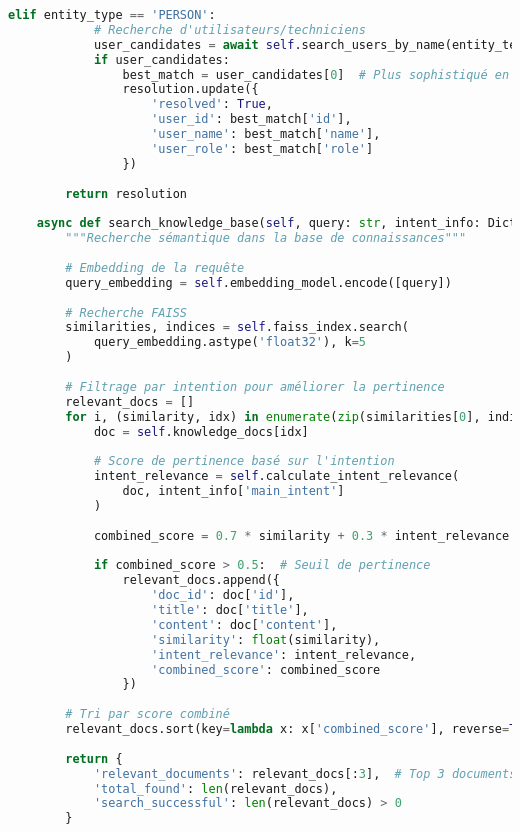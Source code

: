 \documentclass[12pt,a4paper]{report}
\begin{document}
\begin{lstlisting}[language=Python, caption=Pipeline NLP avancé pour le chatbot]
        elif entity_type == 'PERSON':
            # Recherche d'utilisateurs/techniciens
            user_candidates = await self.search_users_by_name(entity_text)
            if user_candidates:
                best_match = user_candidates[0]  # Plus sophistiqué en production
                resolution.update({
                    'resolved': True,
                    'user_id': best_match['id'],
                    'user_name': best_match['name'],
                    'user_role': best_match['role']
                })
        
        return resolution
    
    async def search_knowledge_base(self, query: str, intent_info: Dict) -> Dict:
        """Recherche sémantique dans la base de connaissances"""
        
        # Embedding de la requête
        query_embedding = self.embedding_model.encode([query])
        
        # Recherche FAISS
        similarities, indices = self.faiss_index.search(
            query_embedding.astype('float32'), k=5
        )
        
        # Filtrage par intention pour améliorer la pertinence
        relevant_docs = []
        for i, (similarity, idx) in enumerate(zip(similarities[0], indices[0])):
            doc = self.knowledge_docs[idx]
            
            # Score de pertinence basé sur l'intention
            intent_relevance = self.calculate_intent_relevance(
                doc, intent_info['main_intent']
            )
            
            combined_score = 0.7 * similarity + 0.3 * intent_relevance
            
            if combined_score > 0.5:  # Seuil de pertinence
                relevant_docs.append({
                    'doc_id': doc['id'],
                    'title': doc['title'],
                    'content': doc['content'],
                    'similarity': float(similarity),
                    'intent_relevance': intent_relevance,
                    'combined_score': combined_score
                })
        
        # Tri par score combiné
        relevant_docs.sort(key=lambda x: x['combined_score'], reverse=True)
        
        return {
            'relevant_documents': relevant_docs[:3],  # Top 3 documents
            'total_found': len(relevant_docs),
            'search_successful': len(relevant_docs) > 0
        }
    

\end{lstlisting}
\end{document}
